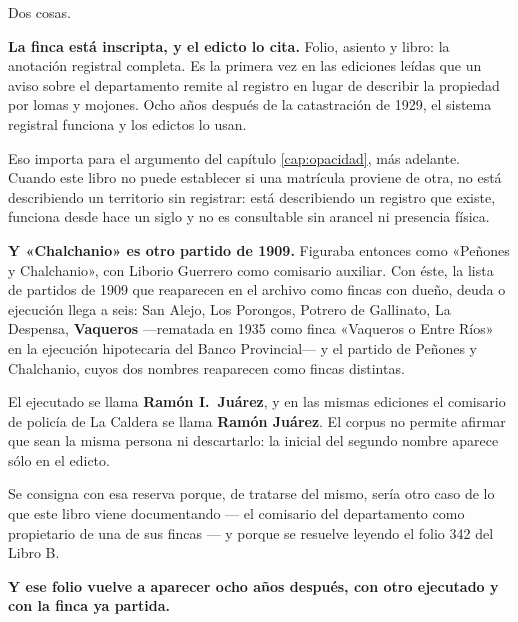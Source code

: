 Dos cosas.

\textbf{La finca está inscripta, y el edicto lo cita.} Folio, asiento y libro: la anotación
registral completa. Es la primera vez en las ediciones leídas que un aviso sobre el departamento remite al
registro en lugar de describir la propiedad por lomas y mojones. Ocho años después de la
catastración de 1929, el sistema registral funciona y los edictos lo usan.

Eso importa para el argumento del capítulo \ref{cap:opacidad}, más adelante. Cuando este libro no puede establecer si una
matrícula proviene de otra, no está describiendo un territorio sin registrar: está
describiendo un registro que existe, funciona desde hace un siglo y no es consultable sin
arancel ni presencia física.

\textbf{Y «Chalchanio» es otro partido de 1909.} Figuraba entonces como «Peñones y
Chalchanio», con Liborio Guerrero como comisario auxiliar. Con éste, la lista de partidos de
1909 que reaparecen en el archivo como fincas con dueño, deuda o ejecución llega a seis:
San Alejo, Los Porongos, Potrero de Gallinato, La Despensa, \textbf{Vaqueros} ---rematada en
1935 como finca «Vaqueros o Entre Ríos» en la ejecución hipotecaria del Banco Provincial--- y
el partido de Peñones y Chalchanio, cuyos dos nombres reaparecen como fincas distintas.

\begin{cautela}
El ejecutado se llama \textbf{Ramón I.\ Juárez}, y en las mismas ediciones el comisario de
policía de La Caldera se llama \textbf{Ramón Juárez}. El corpus no permite afirmar que sean
la misma persona ni descartarlo: la inicial del segundo nombre aparece sólo en el edicto.

Se consigna con esa reserva porque, de tratarse del mismo, sería otro caso de lo que este
libro viene documentando --- el comisario del departamento como propietario de una de sus
fincas --- y porque se resuelve leyendo el folio 342 del Libro B.
\end{cautela}

\textbf{Y ese folio vuelve a aparecer ocho años después, con otro ejecutado y con la finca ya
partida.}

